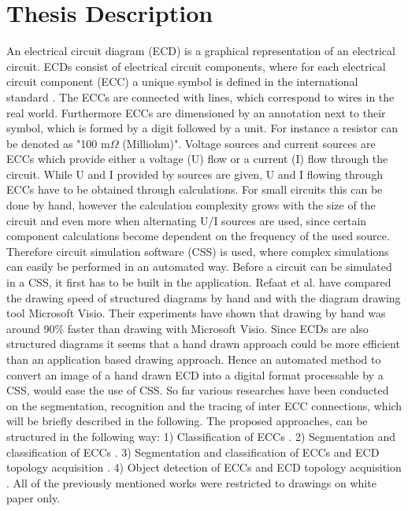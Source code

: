 \documentclass{article} %
\begin{document}
\section*{Thesis Description}
An electrical circuit diagram (ECD) is a graphical representation of an electrical
circuit.
ECDs consist of electrical circuit components, where for each electrical
circuit component (ECC) a unique symbol is defined in the international standard \cite{iec60617}.
The ECCs are connected with lines, which correspond to wires in the real world.
Furthermore ECCs are dimensioned by an annotation next to their symbol, which is formed by a digit followed by a unit.
For instance a resistor can be denoted as "100 m{$\Omega$} (Milliohm)".
Voltage sources and current sources are ECCs which provide either a voltage (U) flow or a current (I) flow through the circuit.
While U and I provided by sources are given, U and I flowing through ECCs have to be obtained through calculations.
For small circuits this can be done by hand, however the calculation complexity grows with the size of the circuit and even more when alternating U/I sources are used, since certain component calculations become dependent on the frequency of the used source.
Therefore circuit simulation software (CSS) is used, where complex simulations can easily be performed in an automated way.
Before a circuit can be simulated in a CSS, it first has to be built in the application.
Refaat et al. \cite{ctxindependentsvm} have compared the drawing speed of structured diagrams by hand and with the diagram drawing tool Microsoft Visio.
Their experiments have shown that drawing by hand was around 90\% faster than drawing with Microsoft Visio.
Since ECDs are also structured diagrams it seems that a hand drawn approach could be more efficient than an application based drawing approach.
Hence an automated method to convert an image of a hand drawn ECD into a digital format processable by a CSS, would ease the use of CSS.
\lf
So far various researches have been conducted on the segmentation, recognition and the
tracing of inter ECC connections, which will be briefly described in the following. The
proposed approaches, can be structured in the following way:
1) Classification of ECCs \cite{anngeo, basecnn, texturesmo}.
2) Segmentation and classification of ECCs \cite{seghogsvm, fouriersvm}.
3) Segmentation and classification of ECCs and ECD topology acquisition \cite{knnfull}.
4) Object detection of ECCs and ECD topology acquisition \cite{yolobool}.
All of the previously mentioned works were restricted to drawings on white
paper only.
\end{document}
